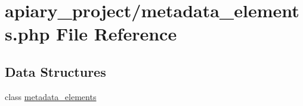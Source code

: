 \hypertarget{metadata__elements_8php}{
\section{apiary_project/metadata\_\-elements.php File Reference}
\label{metadata__elements_8php}
}
\subsection*{Data Structures}
\begin{DoxyCompactItemize}
\item 
class \hyperlink{classmetadata__elements}{metadata\_\-elements}
\end{DoxyCompactItemize}
